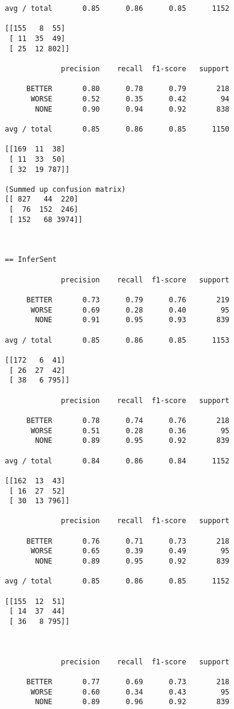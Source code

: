 \begin{appendices}
\begin{verbatim}
avg / total       0.85      0.86      0.85      1152

[[155   8  55]
 [ 11  35  49]
 [ 25  12 802]]
 
             precision    recall  f1-score   support

     BETTER       0.80      0.78      0.79       218
      WORSE       0.52      0.35      0.42        94
       NONE       0.90      0.94      0.92       838

avg / total       0.85      0.86      0.85      1150

[[169  11  38]
 [ 11  33  50]
 [ 32  19 787]]

(Summed up confusion matrix)
[[ 827   44  220]
 [  76  152  246]
 [ 152   68 3974]]



== InferSent

             precision    recall  f1-score   support

     BETTER       0.73      0.79      0.76       219
      WORSE       0.69      0.28      0.40        95
       NONE       0.91      0.95      0.93       839

avg / total       0.85      0.86      0.85      1153

[[172   6  41]
 [ 26  27  42]
 [ 38   6 795]]
 
             precision    recall  f1-score   support

     BETTER       0.78      0.74      0.76       218
      WORSE       0.51      0.28      0.36        95
       NONE       0.89      0.95      0.92       839

avg / total       0.84      0.86      0.84      1152

[[162  13  43]
 [ 16  27  52]
 [ 30  13 796]]
 
             precision    recall  f1-score   support

     BETTER       0.76      0.71      0.73       218
      WORSE       0.65      0.39      0.49        95
       NONE       0.89      0.95      0.92       839

avg / total       0.85      0.86      0.85      1152

[[155  12  51]
 [ 14  37  44]
 [ 36   8 795]]
 
 
 
             precision    recall  f1-score   support

     BETTER       0.77      0.69      0.73       218
      WORSE       0.60      0.34      0.43        95
       NONE       0.89      0.96      0.92       839


\end{verbatim}
\end{appendices}
